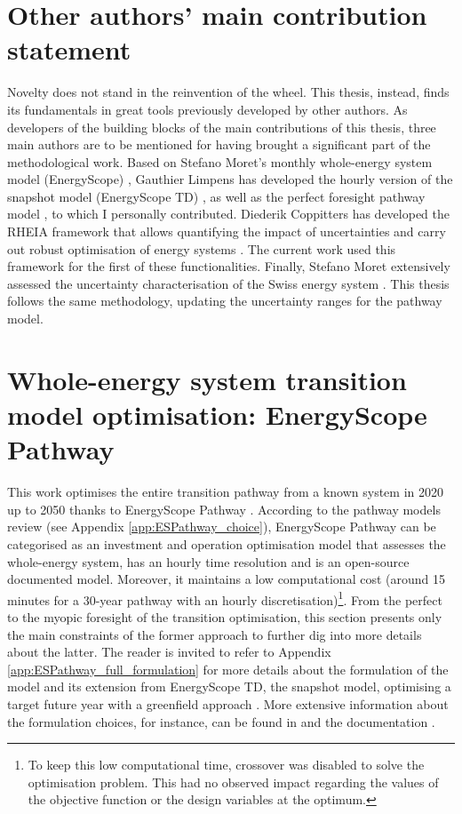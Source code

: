 \section*{Other authors' main contribution statement}
Novelty does not stand in the reinvention of the wheel.  This thesis, instead, finds its fundamentals in great tools previously developed by other authors. As developers of the building blocks of the main contributions of this thesis, three main authors are to be mentioned for having brought a significant part of the methodological work. Based on Stefano Moret's monthly whole-energy system model (\ie EnergyScope) \cite{moret2016strategic}, Gauthier Limpens has developed the hourly version of the snapshot model (\ie EnergyScope TD) \cite{limpens2019energyscope}, as well as the perfect foresight pathway model \cite{limpens2024pathway}, to which I personally contributed. Diederik Coppitters has developed the RHEIA framework that allows quantifying the impact of uncertainties and carry out robust optimisation of energy systems \cite{coppittersthesis}. The current work used this framework for the first of these functionalities. Finally, Stefano Moret extensively assessed the uncertainty characterisation of the Swiss energy system \cite{Moret2017}. This thesis follows the same methodology, updating the uncertainty ranges for the pathway model.

\section[EnergyScope Pathway]{Whole-energy system transition model optimisation: EnergyScope Pathway}
\label{sec:meth:ES}

This work optimises the entire transition pathway from a known system in 2020 up to 2050 thanks to EnergyScope Pathway \cite{limpens2024pathway}. According to the pathway models review (see Appendix \ref{app:ESPathway_choice}), EnergyScope Pathway can be categorised as an investment and operation optimisation model that assesses the whole-energy system, has an hourly time resolution and is an open-source documented model. Moreover, it maintains a low computational cost (\ie around 15 minutes for a 30-year pathway with an hourly discretisation)\footnote{To keep this low computational time, crossover was disabled to solve the optimisation problem. This had no observed impact regarding the values of the objective function or the design variables at the optimum.}. From the perfect to the myopic foresight of the transition optimisation, this section presents only the main constraints of the former approach to further dig into more details about the latter. The reader is invited to refer to Appendix \ref{app:ESPathway_full_formulation} for more details about the formulation of the model and its extension from EnergyScope TD, the snapshot model, optimising a target future year with a greenfield approach \cite{geidl2006greenfield}. More extensive information about the formulation choices, for instance, can be found in \cite{limpens2024pathway} and the documentation \cite{readthedocs_pathway}.

